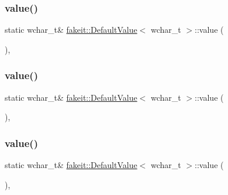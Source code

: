 \subsubsection{\texorpdfstring{value()}{value()}\hspace{0.1cm}{\footnotesize\ttfamily [1/9]}}
{\footnotesize\ttfamily static wchar\+\_\+t\& \mbox{\hyperlink{structfakeit_1_1DefaultValue}{fakeit\+::\+Default\+Value}}$<$ wchar\+\_\+t $>$\+::value (\begin{DoxyParamCaption}{ }\end{DoxyParamCaption})\hspace{0.3cm}{\ttfamily [inline]}, {\ttfamily [static]}}

\mbox{\label{structfakeit_1_1DefaultValue_3_01wchar__t_01_4_aa6bedce29b3176a4996c7d95e5a4cb0c}} 
\subsubsection{\texorpdfstring{value()}{value()}\hspace{0.1cm}{\footnotesize\ttfamily [2/9]}}
{\footnotesize\ttfamily static wchar\+\_\+t\& \mbox{\hyperlink{structfakeit_1_1DefaultValue}{fakeit\+::\+Default\+Value}}$<$ wchar\+\_\+t $>$\+::value (\begin{DoxyParamCaption}{ }\end{DoxyParamCaption})\hspace{0.3cm}{\ttfamily [inline]}, {\ttfamily [static]}}

\mbox{\label{structfakeit_1_1DefaultValue_3_01wchar__t_01_4_aa6bedce29b3176a4996c7d95e5a4cb0c}} 
\subsubsection{\texorpdfstring{value()}{value()}\hspace{0.1cm}{\footnotesize\ttfamily [3/9]}}
{\footnotesize\ttfamily static wchar\+\_\+t\& \mbox{\hyperlink{structfakeit_1_1DefaultValue}{fakeit\+::\+Default\+Value}}$<$ wchar\+\_\+t $>$\+::value (\begin{DoxyParamCaption}{ }\end{DoxyParamCaption})\hspace{0.3cm}{\ttfamily [inline]}, {\ttfamily [static]}}

